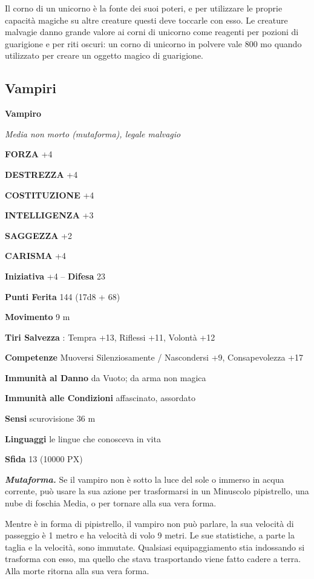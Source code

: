 \begin{multicols}{2}
	Il corno di un unicorno è la fonte dei suoi poteri, e per utilizzare le proprie capacità magiche su altre creature questi deve toccarle con esso. Le creature malvagie danno grande valore ai corni di unicorno come reagenti per pozioni di guarigione e per riti oscuri: un corno di unicorno in polvere vale 800 mo quando utilizzato per creare un oggetto magico di guarigione.

	\subsection{Vampiri}

	\medskip{}\textbf{Vampiro}

	\textit{Media non morto (mutaforma), legale malvagio}

	\textbf{FORZA} +4

	\textbf{DESTREZZA} +4

	\textbf{COSTITUZIONE} +4

	\textbf{INTELLIGENZA} +3

	\textbf{SAGGEZZA} +2

	\textbf{CARISMA} +4

	\textbf{Iniziativa} +4 -- \textbf{Difesa} 23

	\textbf{Punti Ferita} 144 (17d8 + 68)

	\textbf{Movimento} 9 m

	\textbf{Tiri Salvezza} : Tempra +13, Riflessi +11, Volontà +12

	\textbf{Competenze} Muoversi Silenziosamente / Nascondersi +9, Consapevolezza +17

	\textbf{Immunità al Danno} da Vuoto; da arma non magica

	\textbf{Immunità alle Condizioni} affascinato, assordato

	\textbf{Sensi} scurovisione 36 m

	\textbf{Linguaggi} le lingue che conosceva in vita

	\textbf{Sfida} 13 (10000 PX)

	\textit{\textbf{Mutaforma.}} Se il vampiro non è sotto la luce del sole o immerso in acqua corrente, può usare la sua azione per trasformarsi in un Minuscolo pipistrello, una nube di foschia Media, o per tornare alla sua vera forma.

	Mentre è in forma di pipistrello, il vampiro non può parlare, la sua velocità di passeggio è 1 metro e ha velocità di volo 9 metri. Le sue statistiche, a parte la taglia e la velocità, sono immutate. Qualsiasi equipaggiamento stia indossando si trasforma con esso, ma quello che stava trasportando viene fatto cadere a terra. Alla morte ritorna alla sua vera forma.


\end{multicols}
